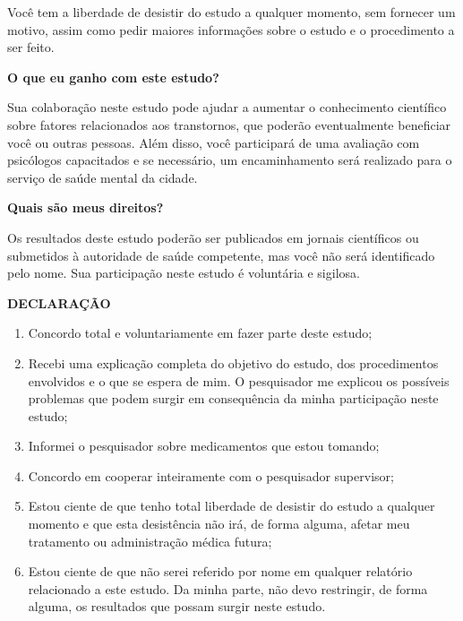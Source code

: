 \documentclass[chapter=TITLE,
               oneside,
               12pt,
               a4paper,
               english,
               brazil]{abntex2}    %
\begin{document}
\begin{anexosenv}
{        Você tem a liberdade de desistir do estudo a qualquer momento, sem
        fornecer um motivo, assim como pedir maiores informações sobre o estudo
        e o procedimento a ser feito.
        
        \textbf{O que eu ganho com este estudo?}

        Sua colaboração neste estudo pode ajudar a aumentar o conhecimento
        científico sobre fatores relacionados aos transtornos, que poderão
        eventualmente beneficiar você ou outras pessoas. Além disso, você
        participará de uma avaliação com psicólogos capacitados e se necessário,
        um encaminhamento será realizado para o serviço de saúde mental da cidade.

        \textbf{Quais são meus direitos?}

        Os resultados deste estudo poderão ser publicados em jornais científicos
        ou submetidos à autoridade de saúde competente, mas você não será
        identificado pelo nome. Sua participação neste estudo é voluntária e
        sigilosa.

        \textbf{DECLARAÇÃO}

            \begin{enumerate}

                \item Concordo total e voluntariamente em fazer parte deste estudo;

                \item Recebi uma explicação completa do objetivo do estudo, dos
                procedimentos envolvidos e o que se espera de mim. O pesquisador
                me explicou os possíveis problemas que podem surgir em consequência
                da minha participação neste estudo;

                \item Informei o pesquisador sobre medicamentos que estou tomando;

                \item Concordo em cooperar inteiramente com o pesquisador supervisor;

                \item Estou ciente de que tenho total liberdade de desistir do estudo
                a qualquer momento e que esta desistência não irá, de forma alguma,
                afetar meu tratamento ou administração médica futura;

                \item Estou ciente de que não serei referido por nome em qualquer
                relatório relacionado a este estudo. Da minha parte, não devo
                restringir, de forma alguma, os resultados que possam surgir
                neste estudo.


\end{enumerate}}
\end{anexosenv}
\end{document}
